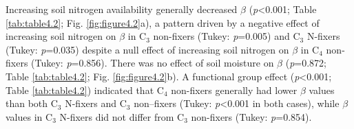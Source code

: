 Increasing soil nitrogen availability generally decreased $\beta$  (\textit{p}<0.001; Table \ref{tab:table4.2}; Fig. \ref{fig:figure4.2}a), a pattern driven by a negative effect of increasing soil nitrogen on $\beta$  in C$_3$ non-fixers (Tukey: \textit{p}=0.005) and C$_3$ N-fixers (Tukey: \textit{p}=0.035) despite a null effect of increasing soil nitrogen on $\beta$ in C$_4$ non-fixers (Tukey: \textit{p}=0.856). There was no effect of soil moisture on $\beta$  (\textit{p}=0.872; Table \ref{tab:table4.2}; Fig. \ref{fig:figure4.2}b). A functional group effect (\textit{p}<0.001; Table \ref{tab:table4.2}) indicated that C$_4$ non-fixers generally had lower $\beta$ values than both C$_3$ N-fixers and C$_3$ non--fixers (Tukey: \textit{p}<0.001 in both cases), while $\beta$ values in C$_3$ N-fixers did not differ from C$_3$ non-fixers (Tukey: \textit{p}=0.854).

